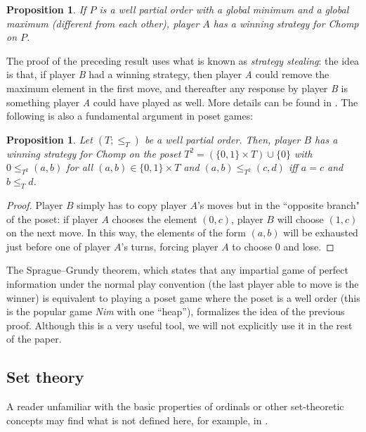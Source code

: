 \documentclass[reqno]{amsart}
\newtheorem{proposition}[theorem]{Proposition}
\theoremstyle{definition}
\theoremstyle{definition}
\theoremstyle{plain} %
\begin{document}
\begin{proposition}
    If $ P $ is a well partial order with a global minimum and a global maximum (different from each other), player $A$ has a winning strategy for Chomp on $P$.
\end{proposition}
The proof of the preceding result uses what is known as \emph{strategy stealing}: the idea is that, if player \textit{B} had a winning strategy, then player \textit{A} could remove the maximum element in the first move, and thereafter any response by player \textit{B} is something player \textit{A} could have played as well. More details can be found in \cite{intro}. The following is also a fundamental argument in poset games:
\begin{proposition}\label{propsim}
    Let $ (T; \leq_T) $ be a well partial order. Then, player $B$ has a winning strategy for Chomp on the poset $  T^2 = (\{0,1\} \times T) \cup \{0\} $ with $0\leq_{T^2} (a,b)$ for all $(a,b)\in\{0,1\} \times T $ and $ (a,b) \leq_{T^2} (c,d) $ iff $  a = c $ and $ b \leq_T d $.
\end{proposition}\begin{proof} Player $  B $ simply has to copy player $A$'s moves but in the ``opposite branch" of the poset: if player $A$ chooses the element $(0,c) $, player $B$ will choose $(1,c)$ on the next move. In this way, the elements of the form $(a,b)$ will be exhausted just before one of player $A$'s turns, forcing player $A$ to choose $0 $ and lose. \end{proof}
The Sprague–Grundy theorem, which states that any impartial game of perfect information under the normal play convention (the last player able to move is the winner) is equivalent to playing a poset game where the poset is a well order (this is the popular game \textit{Nim} with one ``heap''), formalizes the idea of the previous proof. Although this is a very useful tool, we will not explicitly use it in the rest of the paper.
\subsection{Set theory} A reader unfamiliar with the basic properties of ordinals or other set-theoretic concepts may find what is not defined here, for example, in \cite{Jech2003}.
\end{document}
